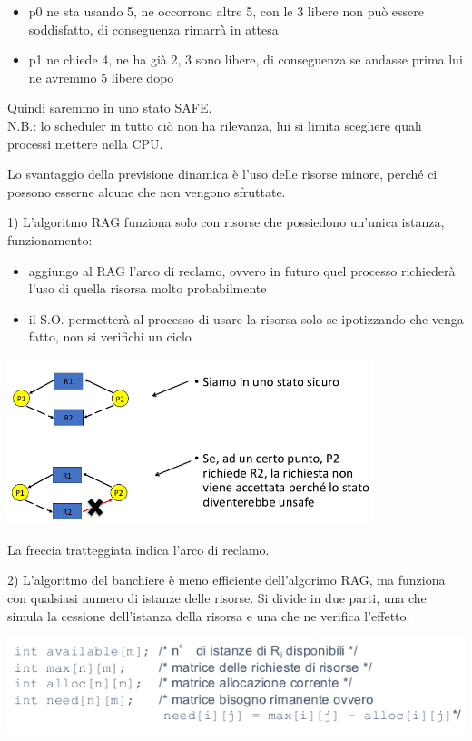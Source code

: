 \documentclass[a4paper, 12pt]{book}
\begin{document}
\begin{itemize}
    \item p0 ne sta usando 5, ne occorrono altre 5, con le 3 libere non può essere soddisfatto, di conseguenza rimarrà in attesa
    \item p1 ne chiede 4, ne ha già 2, 3 sono libere, di conseguenza se andasse prima lui ne avremmo 5 libere dopo
\end{itemize}
Quindi saremmo in uno stato SAFE.\\
N.B.: lo scheduler in tutto ciò non ha rilevanza, lui si limita scegliere quali processi mettere nella CPU.

Lo svantaggio della
previsione dinamica è l'uso delle risorse minore, perché ci possono esserne alcune che non vengono sfruttate.

\vspace{3ex}1) L'algoritmo RAG funziona solo con risorse che possiedono un'unica istanza, funzionamento:

\begin{itemize}
    \item aggiungo al RAG l'arco di reclamo, ovvero in futuro quel processo richiederà l'uso di quella risorsa molto probabilmente
    \item il S.O. permetterà al processo di usare la risorsa solo se ipotizzando che venga fatto, non si verifichi un ciclo
\end{itemize}

\begin{center}
    \includegraphics[width=0.8\textwidth]{rag_reclamo.png}
\end{center}
La freccia tratteggiata indica l'arco di reclamo.

2) L'algoritmo del banchiere è meno efficiente dell'algorimo RAG, ma
funziona con qualsiasi numero di istanze delle risorse. Si divide in due parti, una che simula la cessione dell'istanza della risorsa
e una che ne verifica l'effetto.

\begin{center}
    \includegraphics*[width=1\textwidth]{banchiere3.png}
\end{center}
\end{document}
